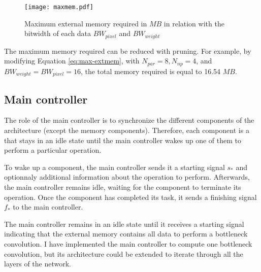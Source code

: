 %
\begin{figure}[H]
    \centering
    \texttt{[image: maxmem.pdf]}
    \caption{Maximum external memory required in $MB$ in relation with the bitwidth of each data $BW_{pixel}$ and $BW_{weight}$}
    \label{fig:max-mem}
\end{figure}
%
The maximum memory required can be reduced with pruning. For example, by modifying Equation \eqref{eq:max-extmem}, with $N_{par} = 8, N_{np} = 4$, and $BW_{weight} = BW_{pixel} = 16$, the total memory required is equal to 16.54 $MB$.
%
\subsection{Main controller}
%
The role of the main controller is to synchronize the different components of the architecture (except the memory components). Therefore, each component is a  that stays in an idle state until the main controller wakes up one of them to perform a particular operation.

To wake up a component, the main controller sends it a starting signal $s_{*}$ and optionnaly additional information about the operation to perform. Afterwards, the main controller remains idle, waiting for the component to terminate its operation. Once the component has completed its task, it sends a finishing signal $f_{*}$ to the main controller.

The main controller remains in an idle state until it receives a starting signal indicating that the external memory contains all data to perform a bottleneck convolution. I have implemented the main controller to compute one bottleneck convolution, but its architecture could be extended to iterate through all the layers of the network.

